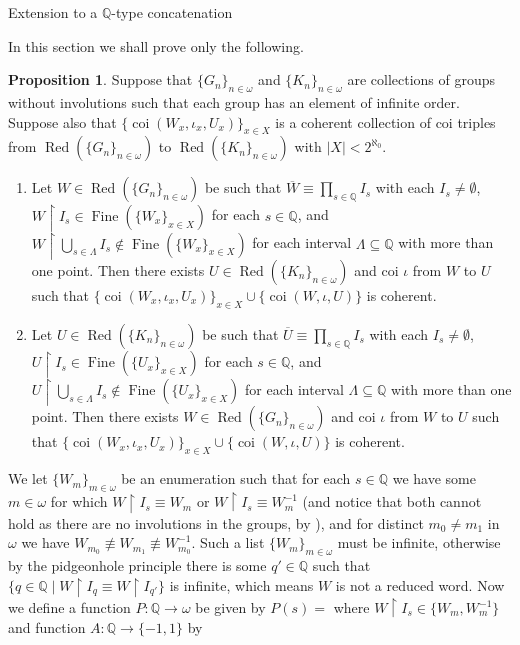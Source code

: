\documentclass{amsart}
\theoremstyle{definition}\newtheorem{theorem}{Theorem}
\theoremstyle{definition}\newtheorem*{A}{Main Theorem}
\theoremstyle{definition}\newtheorem*{B}{Theorem \ref{elementaryequiv}}
\theoremstyle{definition}\newtheorem*{C}{Theorem \ref{continuous}}
\theoremstyle{definition}\newtheorem*{D}{Theorem \ref{bigisomorphism2}}
\theoremstyle{definition}\newtheorem{bigtheorem}{Main Theorem}
\numberwithin{theorem}{section}
\theoremstyle{definition}\newtheorem{corollary}[theorem]{Corollary}
\theoremstyle{definition}\newtheorem{proposition}[theorem]{Proposition}
\theoremstyle{definition}\newtheorem{definition}[theorem]{Definition}
\theoremstyle{definition}\newtheorem{question}[theorem]{Question}
\theoremstyle{definition}\newtheorem{example}[theorem]{Example}
\theoremstyle{definition}\newtheorem{remark}[theorem]{Remark}
\theoremstyle{definition}\newtheorem{note}[theorem]{Note}
\theoremstyle{definition}\newtheorem{lemma}[theorem]{Lemma}
\theoremstyle{definition}\newtheorem{fact}[theorem]{Fact}
\theoremstyle{definition}\newtheorem{define}[theorem]{Definition}
\theoremstyle{definition}\newtheorem{claim}[theorem]{Claim}
\theoremstyle{definition}\newtheorem{obs}[theorem]{Observation}
\theoremstyle{definition}\newtheorem{definitions}[theorem]{Definitions}
\newcommand{\Red}{\operatorname{Red}}
\newcommand{\Fine}{\operatorname{Fine}}
\newcommand{\coi}{\operatorname{coi}}
\begin{document}
\begin{section}{Extension to a $\mathbb{Q}$-type concatenation}\label{Qconcatenation}

In this section we shall prove only the following.

\begin{proposition}\label{Qtypeconcat}    Suppose that $\{G_n\}_{n \in \omega}$ and $\{K_n\}_{n \in \omega}$ are collections of groups without involutions such that each group has an element of infinite order.  Suppose also that $\{\coi(W_x, \iota_x, U_x)\}_{x \in X}$ is a coherent collection of coi triples from $\Red(\{G_n\}_{n \in \omega})$ to $\Red(\{K_n\}_{n \in \omega})$ with $|X|<2^{\aleph_0}$.

\begin{enumerate}

\item Let $W \in \Red(\{G_n\}_{n \in \omega})$ be such that $\overline{W} \equiv \prod_{s \in \mathbb{Q}} I_s$ with each $I_s \neq \emptyset$, $W \upharpoonright I_s \in \Fine(\{W_x\}_{x\in X})$ for each $s \in \mathbb{Q}$, and $W \upharpoonright \bigcup_{s \in \Lambda} I_s \notin \Fine(\{W_x\}_{x\in X})$ for each interval $\Lambda \subseteq \mathbb{Q}$ with more than one point.  Then there exists $U \in \Red(\{K_n\}_{n \in \omega})$ and coi $\iota$ from $W$ to $U$ such that $\{\coi(W_x, \iota_x, U_x)\}_{x\in X} \cup \{\coi(W, \iota, U)\}$ is coherent.

\item Let $U \in \Red(\{K_n\}_{n \in \omega})$ be such that $\overline{U} \equiv \prod_{s \in \mathbb{Q}} I_s$ with each $I_s \neq \emptyset$, $U \upharpoonright I_s \in \Fine(\{U_x\}_{x\in X})$ for each $s \in \mathbb{Q}$, and $U \upharpoonright \bigcup_{s \in \Lambda} I_s \notin \Fine(\{U_x\}_{x\in X})$ for each interval $\Lambda \subseteq \mathbb{Q}$ with more than one point.  Then there exists $W \in \Red(\{G_n\}_{n \in \omega})$ and coi $\iota$ from $W$ to $U$ such that $\{\coi(W_x, \iota_x, U_x)\}_{x\in X} \cup \{\coi(W, \iota, U)\}$ is coherent.



\end{enumerate}


\end{proposition}


We let $\{W_m\}_{m \in \omega}$ be an enumeration such that for each $s \in \mathbb{Q}$ we have some $m\in \omega$ for which $W \upharpoonright I_s \equiv W_m$ or $W \upharpoonright I_s \equiv W_m^{-1}$  (and notice that both cannot hold as there are no involutions in the groups, by \cite[Corollary 1.6]{E}), and for distinct $m_0 \neq m_1$ in $\omega$ we have $W_{m_0} \not\equiv W_{m_1} \not\equiv W_{m_0}^{-1}$.  Such a list $\{W_m\}_{m \in \omega}$ must be infinite, otherwise by the pidgeonhole principle there is some $q' \in \mathbb{Q}$ such that $\{q \in \mathbb{Q} \mid W \upharpoonright I_q \equiv W \upharpoonright I_{q'}\}$ is infinite, which means $W$ is not a reduced word.  Now we define a function $P: \mathbb{Q} \rightarrow \omega$ be given by $P(s) = $ where $W \upharpoonright I_s \in \{W_m, W_m^{-1}\}$ and function $A: \mathbb{Q} \rightarrow \{-1, 1\}$ by


\end{section}
\end{document}
